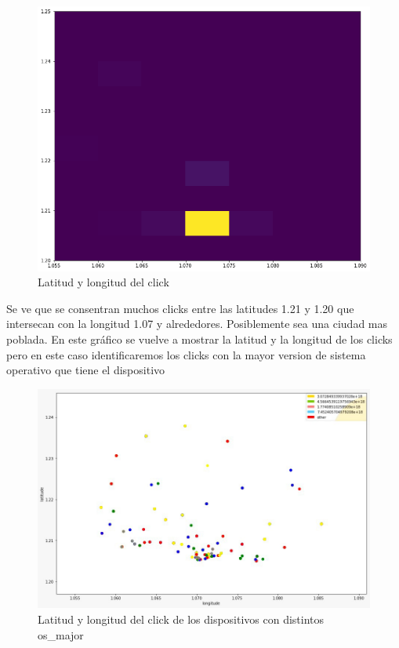 \documentclass[a4paper, 12pt]{article}
\newcommand\tab[1][1cm]{\hspace*{#1}}
\begin{document}
		\FloatBarrier
		\begin{figure}[h]
			\centering
			\includegraphics[scale=0.48]{images/clicks/clicks_lat_long_heat.png}
			\caption{Latitud y longitud del click}
		\end{figure}
		\FloatBarrier


		\tab Se ve que se consentran muchos clicks entre las latitudes 1.21 y 1.20 que intersecan con la longitud 1.07 y alrededores. Posiblemente sea una ciudad mas poblada.
		\newline
		\newline
		\newline
		\newline
		\newline
		\tab En este gráfico se vuelve a mostrar la latitud y la longitud de los clicks pero en este caso identificaremos los clicks con la mayor version de sistema operativo que tiene el dispositivo
		
		\FloatBarrier
		\begin{figure}[h]
			\centering
			\includegraphics[width=\textwidth]{images/clicks/clicks_lat_long_major_OS.png}
			\caption{Latitud y longitud del click de los dispositivos con distintos os\_major}
		\end{figure}
		\FloatBarrier
\end{document}
